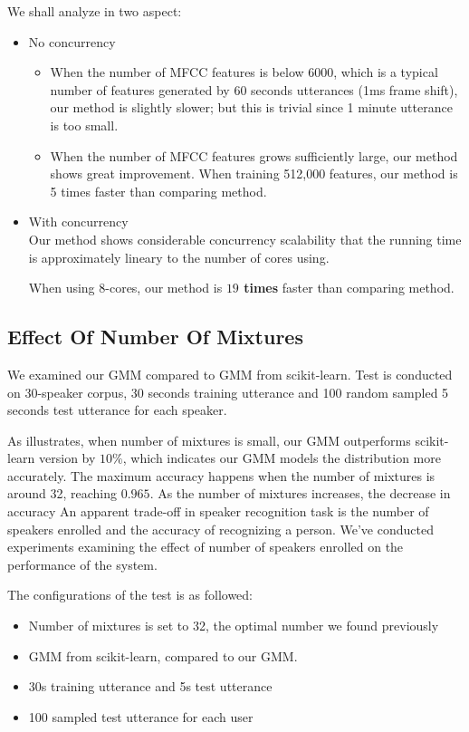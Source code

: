 We shall analyze in two aspect:
\begin{itemize}
	\item No concurrency \\
		\begin{itemize}
			\item When the number of MFCC features is below 6000, which is a typical
				number of features generated by 60 seconds utterances (1ms frame shift),
				our method is slightly slower; but this is trivial since
				1 minute utterance is too small.
			\item When the number of MFCC features grows sufficiently large, our method
				shows great improvement. When training 512,000 features, our method
				is 5 times faster than comparing method.
		\end{itemize}
	\item With concurrency \\
		Our method shows considerable concurrency scalability that the running time
		is approximately lineary to the number of cores using.

		When using 8-cores, our method is \textbf{$19$ times} faster than comparing
		method.
\end{itemize}


\subsection{Effect Of Number Of Mixtures}
We examined our GMM compared to GMM from scikit-learn.
Test is conducted on 30-speaker corpus, 30 seconds training utterance
and 100 random sampled 5 seconds test utterance for each speaker.

As  illustrates, when number of mixtures is small,
our GMM outperforms scikit-learn version by $10\%$, which indicates our
GMM models the distribution more accurately. The maximum accuracy
happens when the number of mixtures is around 32, reaching $0.965$. As
the number of mixtures increases, the decrease in accuracy
An apparent trade-off in speaker recognition task is the number of speakers
enrolled and the accuracy of recognizing a person. We've conducted experiments
examining the effect of number of speakers enrolled on the performance of the
system.

The configurations of the test is as followed:
\begin{itemize}
	\item Number of mixtures is set to 32, the optimal number we found previously
	\item GMM from scikit-learn, compared to our GMM.
	\item 30s training utterance and 5s test utterance
	\item 100 sampled test utterance for each user
\end{itemize}

